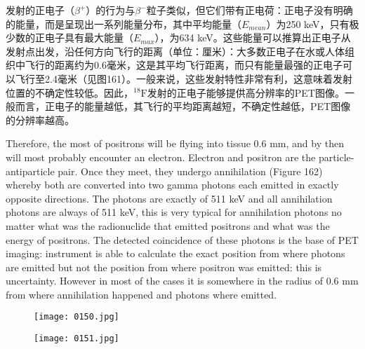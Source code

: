 \documentclass[dvipsnames, svgnames,a4paper,11pt]{article}
\begin{document}
发射的正电子（$\beta^{+}$）的行为与$\beta^{-}$粒子类似，但它们带有正电荷：正电子没有明确的能量，而是呈现出一系列能量分布，其中平均能量（$E_{mean}$）为250 keV，只有极少数的正电子具有最大能量（$E_{max}$），为634 keV。这些能量可以推算出正电子从发射点出发，沿任何方向飞行的距离（单位：厘米）：大多数正电子在水或人体组织中飞行的距离约为0.6毫米，这是其平均飞行距离，而只有能量最强的正电子可以飞行至2.4毫米（见图161）。一般来说，这些发射特性非常有利，这意味着发射位置的不确定性较低。因此，${}^\mathrm{18}\mathrm{F}$发射的正电子能够提供高分辨率的PET图像。一般而言，正电子的能量越低，其飞行的平均距离越短，不确定性越低，PET图像的分辨率越高。

Therefore, the most of positrons will be flying into tissue 0.6 mm, and by then will
most probably encounter an electron. Electron and positron are the particle-
antiparticle pair. Once they meet, they undergo annihilation (Figure 162) whereby
both are converted into two gamma photons each emitted in exactly opposite
directions. The photons are exactly of 511 keV and all annihilation photons are
always of 511 keV, this is very typical for annihilation photons no matter what was
the radionuclide that emitted positrons and what was the energy of positrons. The
detected coincidence of these photons is the base of PET imaging: instrument is
able to calculate the exact position from where photons are emitted but not the
position from where positron was emitted: this is uncertainty. However in most of the
cases it is somewhere in the radius of 0.6 mm from where annihilation happened and
photons where emitted.

\begin{figure}[h]
	\centering
    \texttt{[image: 0150.jpg]}    
     \label{fig161}
\end{figure}

\begin{figure}[h]
	\centering
    \texttt{[image: 0151.jpg]}    
     \label{fig162}
\end{figure}
\end{document}
